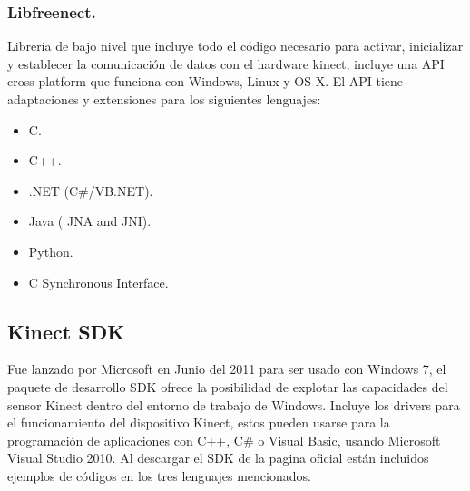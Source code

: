 \documentclass[11pt,a4paper]{article}
\begin{document}
\subsubsection{Libfreenect.}
Librería de bajo nivel que incluye todo el código necesario para activar, inicializar y establecer la comunicación de datos con el hardware kinect, incluye una API cross-platform que funciona con Windows, Linux  y OS X. El API tiene adaptaciones y extensiones para los siguientes lenguajes:
\begin{itemize}
\item C.
\item C++.
\item .NET (C\#/VB.NET).
\item Java ( JNA and JNI).
\item Python.
\item C Synchronous Interface.
\end{itemize} 

\subsection{Kinect SDK}
Fue lanzado por Microsoft en Junio del 2011 para ser usado con Windows 7, el paquete de desarrollo SDK ofrece la posibilidad de explotar las capacidades del sensor Kinect dentro del entorno de trabajo de Windows. Incluye los drivers para el funcionamiento del dispositivo Kinect, estos pueden usarse para la programación de aplicaciones con C++, C\# o Visual Basic, usando Microsoft Visual Studio 2010. Al descargar el SDK de la pagina oficial están incluidos ejemplos de códigos en los tres lenguajes mencionados.
\end{document}
